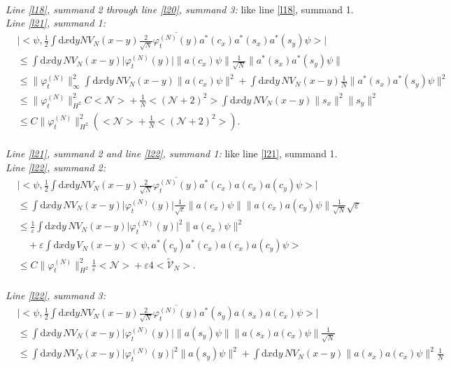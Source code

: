 \documentclass[11pt,a4paper,DIV11]{scrartcl}	%
\newcommand{\di}{\textrm{d}}		%
\newcommand{\Ncal}{\mathcal{N}}		%
\newcommand{\tilV}{\tilde{\mathcal{V}}_N}		%
\newcommand{\estlist}[2]{\emph{\vspace{.3em}\\Line \ref{l#1}, summand #2:}}
\newcommand{\nestlist}[2]{line \ref{l#1}, summand #2}
\newcommand{\Nestlist}[2]{Line \ref{l#1}, summand #2}
\newcommand{\scal}[2]{\big<#1,#2\big>} %
\newcommand{\cc}[1]{\overline{#1}}	%
\newcommand{\norm}[1]{\lVert#1\rVert}	%
\newcommand{\ev}[1]{\big<#1\big>}	%
\newcommand{\ph}{\varphi_t^{(N)}}	%
\newcommand{\dxyNV}{\frac{1}{2}\int \di x\di y N V_N(x-y)} %
\begin{document}
\begin{fleqn}[0.5em]
\emph{\vspace{.3em}\\\Nestlist{18}{2} through \nestlist{20}{3}:} like \nestlist{18}{1}.\newline
\estlist{21}{1}
\begin{align*}
 & \lvert \scal{\psi}{\dxyNV \frac{2}{\sqrt{N}}\cc{\ph(y)}a^\ast(c_x)a^\ast(s_x)a^\ast(s_y)\psi} \rvert \\
& \leq \int \di x\di y\, NV_N(x-y) \lvert\ph(y)\rvert \norm{a(c_x)\psi}\frac{1}{\sqrt{N}}\norm{a^\ast(s_x)a^\ast(s_y)\psi} \\
& \leq \norm{\ph}_\infty^2 \int \di x\di y\, NV_N(x-y) \norm{a(c_x)\psi}^2 + \int \di x\di y\, NV_N(x-y) \frac{1}{N} \norm{a^\ast(s_x)a^\ast(s_y)\psi}^2 \\
& \leq \norm{\ph}_{H^2}^2 C \ev{\Ncal} + \frac{1}{N}\ev{(\Ncal+2)^2} \int \di x\di y\, NV_N(x-y) \norm{s_x}^2 \norm{s_y}^2 \\
& \leq C\norm{\ph}_{H^2}^2 \left( \ev{\Ncal} + \frac{1}{N}\ev{(\Ncal+2)^2} \right).
\end{align*}
\emph{\vspace{.3em}\\\Nestlist{21}{2} and \nestlist{22}{1}:} like \nestlist{21}{1}.\newline
\estlist{22}{2}
\begin{align*}
 & \lvert \scal{\psi}{\dxyNV \frac{2}{\sqrt{N}}\cc{\ph(y)} a^\ast(c_x)a(c_x)a(c_y)\psi} \rvert \\
& \leq \int \di x\di y\, NV_N(x-y) \lvert \ph(y)\rvert \frac{1}{\sqrt{\varepsilon}} \norm{a(c_x)\psi} \norm{a(c_x)a(c_y)\psi} \frac{1}{\sqrt{N}}\sqrt{\varepsilon} \\
& \leq \frac{1}{\varepsilon}\int \di x\di y\, NV_N(x-y) \lvert \ph(y)\rvert^2
  \norm{a(c_x)\psi}^2 \\
& \quad  + \varepsilon \int \di x\di y\, V_N(x-y) \scal{\psi}{a^\ast(c_y)a^\ast(c_x)a(c_x)a(c_y) \psi} \\
& \leq C\norm{\ph}_{H^2}^2 \frac{1}{\varepsilon}\ev{\Ncal} + \varepsilon 4\ev{\tilV}.
\end{align*}
\estlist{22}{3}
\begin{align*}
& \lvert \scal{\psi}{\dxyNV \frac{2}{\sqrt{N}} \cc{\ph(y)}a^\ast(s_y)a(s_x)a(c_x)\psi} \rvert \\
& \leq \int \di x\di y\, NV_N(x-y) \lvert \ph(y)\rvert \norm{a(s_y)\psi} \norm{a(s_x)a(c_x)\psi}\frac{1}{\sqrt{N}} \\
& \leq \int \di x \di y\, NV_N(x-y) \lvert\ph(y)\rvert^2 \norm{a(s_y)\psi}^2 + \int \di x\di y\, NV_N(x-y) \norm{a(s_x)a(c_x)\psi}^2 \frac{1}{N} \\

\end{align*}
\end{fleqn}
\end{document}
